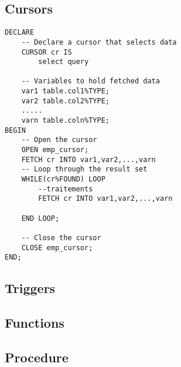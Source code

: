 \vspace{0.5cm}

\subsection{Cursors}
\begin{tcolorbox}[title = cursor]
    \begin{verbatim}
DECLARE
    -- Declare a cursor that selects data
    CURSOR cr IS
        select query

    -- Variables to hold fetched data
    var1 table.col1%TYPE;
    var2 table.col2%TYPE;
    .....
    varn table.coln%TYPE;
BEGIN
    -- Open the cursor
    OPEN emp_cursor;
    FETCH cr INTO var1,var2,...,varn
    -- Loop through the result set
    WHILE(cr%FOUND) LOOP
        --traitements
        FETCH cr INTO var1,var2,...,varn
        
    END LOOP;

    -- Close the cursor
    CLOSE emp_cursor;
END;
    \end{verbatim}
\end{tcolorbox}
\subsection{Triggers}
\subsection{Functions}
\subsection{Procedure}

